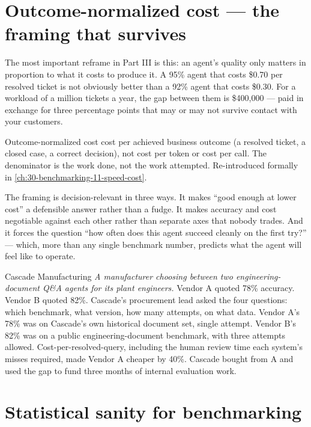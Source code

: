 \section{Outcome-normalized cost --- the framing that survives}

The most important reframe in Part III is this: an agent's quality only matters in proportion to what it costs to produce it. A 95\% agent that costs \$0.70 per resolved ticket is not obviously better than a 92\% agent that costs \$0.30. For a workload of a million tickets a year, the gap between them is \$400,000 --- paid in exchange for three percentage points that may or may not survive contact with your customers.

\begin{TNdefinition}{Outcome-normalized cost} cost per achieved business outcome (a resolved ticket, a closed case, a correct decision), not cost per token or cost per call. The denominator is the work done, not the work attempted. Re-introduced formally in \autoref{ch:30-benchmarking-11-speed-cost}. \end{TNdefinition}

The framing is decision-relevant in three ways. It makes ``good enough at lower cost'' a defensible answer rather than a fudge. It makes accuracy and cost negotiable against each other rather than separate axes that nobody trades. And it forces the question ``how often does this agent succeed cleanly on the first try?'' --- which, more than any single benchmark number, predicts what the agent will feel like to operate.

\begin{TNinpractice}{Cascade Manufacturing} \textit{A manufacturer choosing between two engineering-document Q\&A agents for its plant engineers.} Vendor A quoted 78\% accuracy. Vendor B quoted 82\%. Cascade's procurement lead asked the four questions: which benchmark, what version, how many attempts, on what data. Vendor A's 78\% was on Cascade's own historical document set, single attempt. Vendor B's 82\% was on a public engineering-document benchmark, with three attempts allowed. Cost-per-resolved-query, including the human review time each system's misses required, made Vendor A cheaper by 40\%. Cascade bought from A and used the gap to fund three months of internal evaluation work. \end{TNinpractice}

\section{Statistical sanity for benchmarking}

